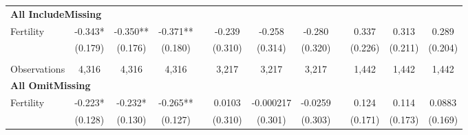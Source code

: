\begin{landscape}
\begin{table}[htpb!]
\begin{center}
\begin{tabular}{lcccp{2mm}cccp{2mm}ccc}
\multicolumn{12}{l}{\textbf{All IncludeMissing}}\\ 
Fertility&-0.343*&-0.350**&-0.371**&&-0.239&-0.258&-0.280&&0.337&0.313&0.289\\
&(0.179)&(0.176)&(0.180)&&(0.310)&(0.314)&(0.320)&&(0.226)&(0.211)&(0.204)\\
\begin{footnotesize}\end{footnotesize}&\begin{footnotesize}\end{footnotesize}&\begin{footnotesize}\end{footnotesize}&\begin{footnotesize}\end{footnotesize}&\begin{footnotesize}\end{footnotesize}&\begin{footnotesize}\end{footnotesize}&\begin{footnotesize}\end{footnotesize}&\begin{footnotesize}\end{footnotesize}&\begin{footnotesize}\end{footnotesize}&\begin{footnotesize}\end{footnotesize}&\begin{footnotesize}\end{footnotesize}&\begin{footnotesize}\end{footnotesize}\\Observations&4,316&4,316&4,316&&3,217&3,217&3,217&&1,442&1,442&1,442\\
\multicolumn{12}{l}{\textbf{All OmitMissing}}\\ 
Fertility&-0.223*&-0.232*&-0.265**&&0.0103&-0.000217&-0.0259&&0.124&0.114&0.0883\\
&(0.128)&(0.130)&(0.127)&&(0.310)&(0.301)&(0.303)&&(0.171)&(0.173)&(0.169)\\

\end{tabular}
\end{center}
\end{table}
\end{landscape}
